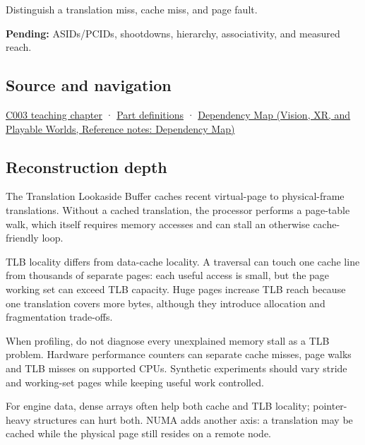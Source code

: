 Distinguish a translation miss, cache miss, and page fault.

\textbf{Pending:} ASIDs/PCIDs, shootdowns, hierarchy, associativity, and measured reach.

\subsection{Source and navigation}\label{appendix-7a2d9c5ce511-source-and-navigation}

\hyperref[01-foundations-i-ch002-where-the-bytes-live]{C003 teaching chapter} · \hyperref[appendix-fd090d982a15-m003---parts-41-60]{Part definitions} · \href{../07-Vision-XR-and-Playable-Worlds/main.pdf\#nameddest=appendix-4ad47bdd269a}{Dependency Map (Vision, XR, and Playable Worlds, Reference notes: Dependency Map)}

\subsection{Reconstruction depth}\label{appendix-7a2d9c5ce511-reconstruction-depth}

The Translation Lookaside Buffer caches recent virtual-page to physical-frame translations. Without a cached translation, the processor performs a page-table walk, which itself requires memory accesses and can stall an otherwise cache-friendly loop.

TLB locality differs from data-cache locality. A traversal can touch one cache line from thousands of separate pages: each useful access is small, but the page working set can exceed TLB capacity. Huge pages increase TLB reach because one translation covers more bytes, although they introduce allocation and fragmentation trade-offs.

When profiling, do not diagnose every unexplained memory stall as a TLB problem. Hardware performance counters can separate cache misses, page walks and TLB misses on supported CPUs. Synthetic experiments should vary stride and working-set pages while keeping useful work controlled.

For engine data, dense arrays often help both cache and TLB locality; pointer-heavy structures can hurt both. NUMA adds another axis: a translation may be cached while the physical page still resides on a remote node.
